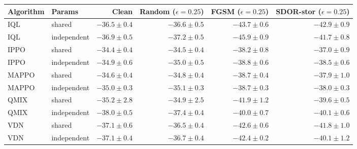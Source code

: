 \begin{tabular}{llrrrr}
\toprule
Algorithm & Params & Clean & Random ($\epsilon=0.25$) & FGSM ($\epsilon=0.25$) & SDOR-stor ($\epsilon=0.25$) \\
\midrule
IQL & shared & $-36.5\pm0.4$ & $-36.6\pm0.5$ & $-43.7\pm0.6$ & $-42.9\pm0.9$ \\
IQL & independent & $-36.9\pm0.5$ & $-37.2\pm0.5$ & $-45.9\pm0.9$ & $-41.7\pm0.8$ \\
\midrule
IPPO & shared & $-34.4\pm0.4$ & $-34.5\pm0.4$ & $-38.2\pm0.8$ & $-37.0\pm0.9$ \\
IPPO & independent & $-34.9\pm0.6$ & $-35.0\pm0.5$ & $-38.8\pm0.6$ & $-38.5\pm0.6$ \\
\midrule
MAPPO & shared & $-34.6\pm0.4$ & $-34.8\pm0.4$ & $-38.7\pm0.4$ & $-37.9\pm1.0$ \\
MAPPO & independent & $-35.0\pm0.3$ & $-35.1\pm0.3$ & $-38.7\pm0.3$ & $-38.0\pm0.3$ \\
\midrule
QMIX & shared & $-35.2\pm2.8$ & $-34.9\pm2.5$ & $-41.9\pm1.2$ & $-39.6\pm0.5$ \\
QMIX & independent & $-38.0\pm0.5$ & $-37.4\pm0.4$ & $-40.0\pm0.7$ & $-40.1\pm0.6$ \\
\midrule
VDN & shared & $-37.1\pm0.6$ & $-36.5\pm0.4$ & $-42.6\pm0.6$ & $-41.8\pm1.0$ \\
VDN & independent & $-37.1\pm0.4$ & $-36.7\pm0.4$ & $-42.4\pm0.2$ & $-40.1\pm1.2$ \\
\bottomrule
\end{tabular}
